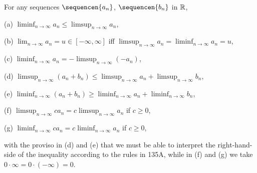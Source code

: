 


 For any sequences $\sequencen{a_n}$,
$\sequencen{b_n}$ in $\Bbb R$,

(a) $\liminf_{n\to\infty}a_n\le\limsup_{n\to\infty}a_n$,

(b) $\lim_{n\to\infty}a_n=u\in[-\infty,\infty]$ iff
$\limsup_{n\to\infty}a_n=\liminf_{n\to\infty}a_n=u$,

(c) $\liminf_{n\to\infty}a_n=-\limsup_{n\to\infty}(-a_n)$,

(d) $\limsup_{n\to\infty}(a_n+b_n)
\le\limsup_{n\to\infty}a_n+\limsup_{n\to\infty}b_n$,

(e) $\liminf_{n\to\infty}(a_n+b_n)
\ge\liminf_{n\to\infty}a_n+\liminf_{n\to\infty}b_n$,

(f) $\limsup_{n\to\infty}ca_n=c\limsup_{n\to\infty}a_n$ if $c\ge 0$,

(g) $\liminf_{n\to\infty}ca_n=c\liminf_{n\to\infty}a_n$ if $c\ge 0$,

\noindent with the proviso in (d) and (e) that we must be able to
interpret the right-hand-side of the inequality according to the rules in 
135A, while in (f) and (g) we take $0\cdot\infty=0\cdot(-\infty)=0$.

